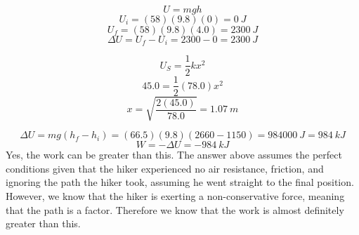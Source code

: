 \documentclass[11pt]{homework}
\begin{document}
\maketitle

\renewcommand{\questiontype}{Problem}
\setcounter{questionCounter}{0}

\question
\[
U = mgh
\]\[
U_i = (58)(9.8)(0) = \qty{0}{J}
\]\[
U_f= (58)(9.8)(4.0) = \qty{2300}{J}
\]\[
\Delta U = U_f - U_i = 2300 - 0 = \boxed{\qty{2300}{J}}
\]

\setcounter{questionCounter}{2}
\question
\[
U_S = \frac{1}{2}kx^2
\]\[
45.0 = \frac{1}{2}(78.0)x^2
\]\[
x = \sqrt{\frac{2(45.0)}{78.0}} = \boxed{\qty{1.07}{m}}
\]

\question
\begin{alphaparts}
    \questionpart
        \[
            \Delta U = mg(h_f-h_i) = (66.5)(9.8)(2660-1150) = \qty{984000}{J} = \boxed{\qty{984}{kJ}}
        \]
    \questionpart
        \[
            W = -\Delta U = \qty{-984}{kJ}
        \]
    \questionpart
        Yes, the work can be greater than this. The answer above assumes the perfect conditions given that the hiker experienced no air resistance, friction, and ignoring the path the hiker took, assuming he went straight to the final position. However, we know that the hiker is exerting a non-conservative force, meaning that the path is a factor. Therefore we know that the work is almost definitely greater than this.
\end{alphaparts}

\setcounter{questionCounter}{5}
\question



\question



\question



\question



\setcounter{questionCounter}{11}
\question



\question



\setcounter{questionCounter}{16}
\question



\setcounter{questionCounter}{18}
\question



\setcounter{questionCounter}{27}
\question



\question



\question



\setcounter{questionCounter}{72}
\question
\end{document}
